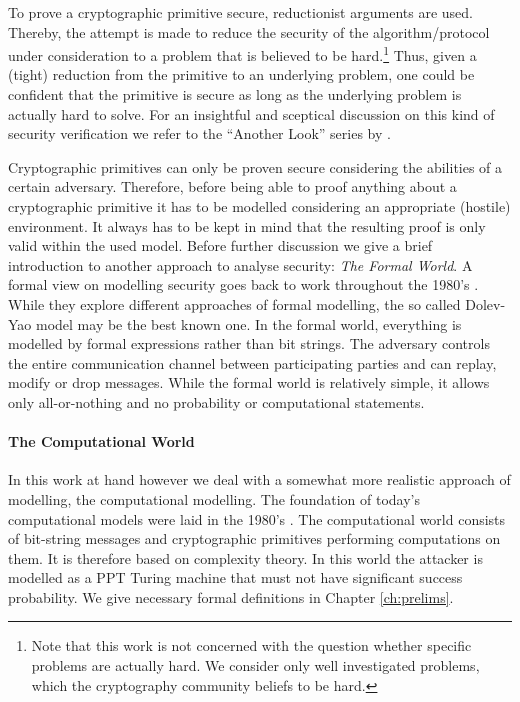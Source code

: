 To prove a cryptographic primitive secure, reductionist arguments are used.
Thereby, the attempt is made to reduce the security of the algorithm/protocol under consideration to a problem that is believed to be hard.\footnote{Note that this work is not concerned with the question whether specific problems are actually hard. We consider only well investigated problems, which the cryptography community beliefs to be hard.}
Thus, given a (tight) reduction from the primitive to an underlying problem, one could be confident that the primitive is secure as long as the underlying problem is actually hard to solve.
For an insightful and sceptical discussion on this kind of security verification we refer to the ``Another Look'' series by \citet{AnotherLook}.

Cryptographic primitives can only be proven secure considering the abilities of a certain adversary.
Therefore, before being able to proof anything about a cryptographic primitive it has to be modelled considering an appropriate (hostile) environment.
It always has to be kept in mind that the resulting proof is only valid within the used model.
Before further discussion we give a brief introduction to another approach to analyse security: \emph{The Formal World}.
A formal view on modelling security goes back to work throughout the 1980's \cite{DeMillo82,Dolev83,Millen87,Meadows91,Kemmerer1988,Burrows90}.
While they explore different approaches of formal modelling, the so called Dolev-Yao model \cite{Dolev83} may be the best known one.
In the formal world, everything is modelled by formal expressions rather than bit strings.
The adversary controls the entire communication channel between participating parties and can replay, modify or drop messages.
While the formal world is relatively simple, it allows only all-or-nothing  and no probability or computational statements.

\paragraph{The Computational World}
In this work at hand however we deal with a somewhat more realistic approach of modelling, the computational modelling.
The foundation of today's computational models were laid in the 1980's \cite{Goldwasser82,Goldwasser84,Yao82,Blum82}.
The computational world consists of bit-string messages and cryptographic primitives performing computations on them.
It is therefore based on complexity theory.
In this world the attacker is modelled as a \ac{PPT} Turing machine \cite{Turing37} that must not have significant success probability.
We give necessary formal definitions in Chapter \ref{ch:prelims}.

